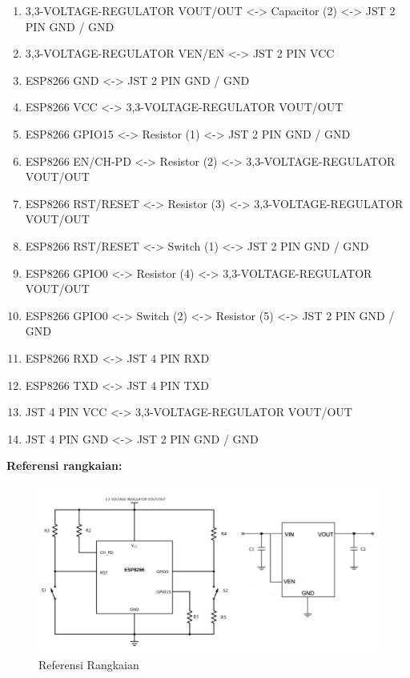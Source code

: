 \begin{enumerate}
\begin{enumerate}
        \item 3,3-VOLTAGE-REGULATOR VOUT/OUT <-> Capacitor (2) <-> JST 2 PIN GND / GND
        \item 3,3-VOLTAGE-REGULATOR VEN/EN <-> JST 2 PIN VCC
        \item ESP8266 GND <-> JST 2 PIN GND / GND
        \item ESP8266 VCC <-> 3,3-VOLTAGE-REGULATOR VOUT/OUT
        \item ESP8266 GPIO15 <-> Resistor (1) <-> JST 2 PIN GND / GND
        \item ESP8266 EN/CH-PD <-> Resistor (2) <-> 3,3-VOLTAGE-REGULATOR VOUT/OUT
        \item ESP8266 RST/RESET <-> Resistor (3) <-> 3,3-VOLTAGE-REGULATOR VOUT/OUT
        \item ESP8266 RST/RESET <-> Switch (1) <-> JST 2 PIN GND / GND
        \item ESP8266 GPIO0 <-> Resistor (4) <-> 3,3-VOLTAGE-REGULATOR VOUT/OUT
        \item ESP8266 GPIO0 <-> Switch (2) <-> Resistor (5) <-> JST 2 PIN GND / GND
        \item ESP8266 RXD <-> JST 4 PIN RXD
        \item ESP8266 TXD <-> JST 4 PIN TXD
        \item JST 4 PIN VCC <-> 3,3-VOLTAGE-REGULATOR VOUT/OUT
        \item JST 4 PIN GND <-> JST 2 PIN GND / GND
    \end{enumerate}
\end{enumerate}
\textbf{Referensi rangkaian:}
\begin{figure}[H]
    \centering
    \includegraphics[width=0.8\linewidth]{P1/img/referensi.png}
    \caption{Referensi Rangkaian} 
    \label{fig:referensirangkaian}
\end{figure}

